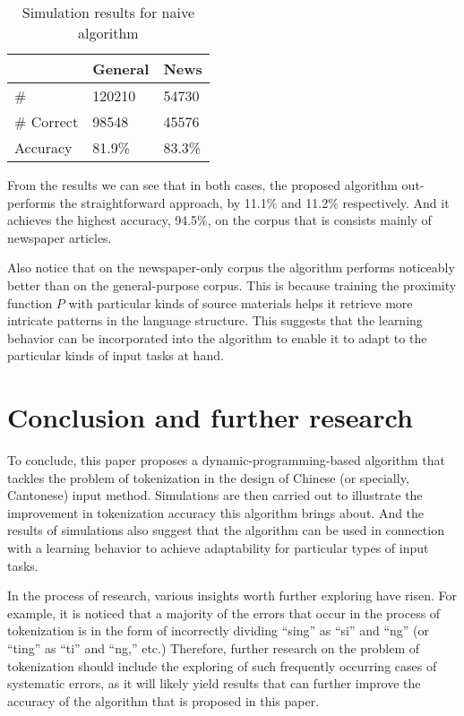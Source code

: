 \documentclass[a4paper,11pt,twocolumn]{article}
\begin{document}
\begin{table}[h]
\centering
\begin{tabular}{@{}lll@{}}
\toprule
           & General & News \\ \midrule
\#         & 120210 & 54730 \\
\# Correct & 98548 & 45576 \\
Accuracy   & 81.9\% & 83.3\% \\ \bottomrule
\end{tabular}
\caption{Simulation results for naive algorithm}
\label{table:naive}
\end{table}

From the results we can see that in both cases, the proposed algorithm out-performs the straightforward approach, by 11.1\% and 11.2\% respectively. And it achieves the highest accuracy, 94.5\%, on the corpus that is consists mainly of newspaper articles.

Also notice that on the newspaper-only corpus the algorithm performs noticeably better than on the general-purpose corpus. This is because training the proximity function $P$ with particular kinds of source materials helps it retrieve more intricate patterns in the language structure. This suggests that the learning behavior can be incorporated into the algorithm to enable it to adapt to the particular kinds of input tasks at hand.

\section{Conclusion and further research}

To conclude, this paper proposes a dynamic-programming-based algorithm that tackles the problem of tokenization in the design of Chinese (or specially, Cantonese) input method. Simulations are then carried out to illustrate the improvement in tokenization accuracy this algorithm brings about. And the results of simulations also suggest that the algorithm can be used in connection with a learning behavior to achieve adaptability for particular types of input tasks.

In the process of research, various insights worth further exploring have risen. For example, it is noticed that a majority of the errors that occur in the process of tokenization is in the form of incorrectly dividing ``sing'' as ``si'' and ``ng'' (or ``ting'' as ``ti'' and ``ng,'' etc.) Therefore, further research on the problem of tokenization should include the exploring of such frequently occurring cases of systematic errors, as it will likely yield results that can further improve the accuracy of the algorithm that is proposed in this paper.



\end{document}
